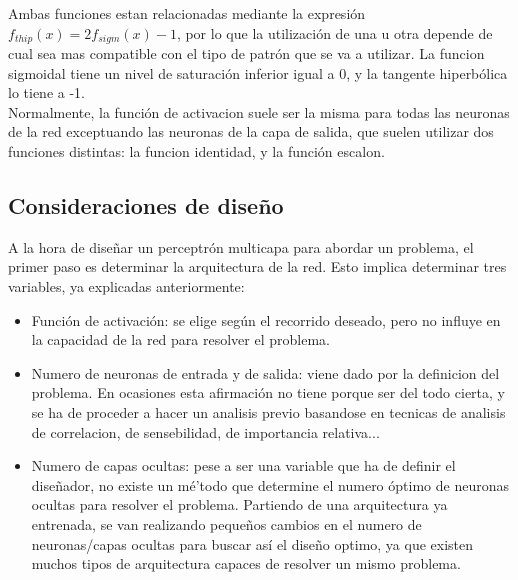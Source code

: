 Ambas funciones estan relacionadas mediante la expresión ${f_{thip}(x)=2f_{sigm}(x)-1}$, por lo que la utilización de una u otra depende de cual sea mas compatible con el tipo de patrón que se va a utilizar. La funcion sigmoidal tiene un nivel de saturación inferior igual a 0, y la tangente hiperbólica lo tiene a -1.\\
Normalmente, la función de activacion suele ser la misma para todas las neuronas de la red exceptuando las neuronas de la capa de salida, que suelen utilizar dos funciones distintas: la funcion identidad, y la función escalon.
\subsection{Consideraciones de diseño}
A la hora de diseñar un perceptrón multicapa para abordar un problema, el primer paso es determinar la arquitectura de la red. Esto implica determinar tres variables, ya explicadas anteriormente:
\begin{itemize}
\item Función de activación: se elige según el recorrido deseado, pero no influye en la capacidad de la red para resolver el problema.
\item Numero de neuronas de entrada y de salida: viene dado por la definicion del problema. En ocasiones esta afirmación no tiene porque ser del todo cierta, y se ha de proceder a hacer un analisis previo basandose en tecnicas de analisis de correlacion, de sensebilidad, de importancia relativa...
\item Numero de capas ocultas: pese a ser una variable que ha de definir el diseñador, no existe un mé'todo que determine el numero óptimo de neuronas ocultas para resolver el problema. Partiendo de una arquitectura ya entrenada, se van realizando pequeños cambios en el numero de neuronas/capas ocultas para buscar así el diseño optimo, ya que existen muchos tipos de arquitectura capaces de resolver un mismo problema.
\end{itemize}
